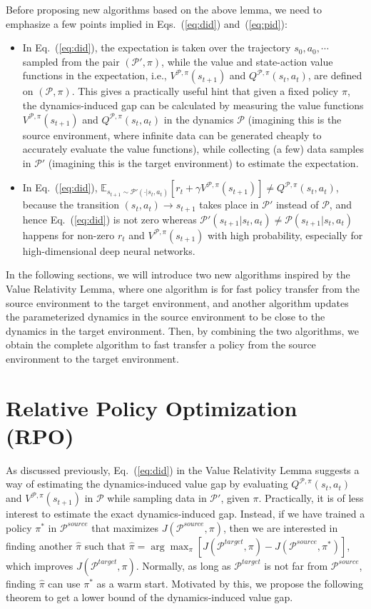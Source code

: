 \documentclass[letterpaper]{article} %
\def\E{{\mathbb{E}}}
\def\P{{\mathcal{P}}}
\begin{document}
Before proposing new algorithms based on the above lemma, we need to emphasize a few points implied in Eqs.~(\ref{eq:did}) and~(\ref{eq:pid}):
\begin{itemize}
	\item In Eq.~(\ref{eq:did}), the expectation is taken over the trajectory $s_0, a_0, \cdots$ sampled from the pair $(\P',\pi)$, while the value and state-action value functions in the expectation, i.e., $V^{\P,\pi}(s_{t+1})$ and $Q^{\P,\pi}(s_t,a_t)$, are defined on $(\P,\pi)$. This gives a practically useful hint that given a fixed policy $\pi$, the dynamics-induced gap can be calculated by measuring the value functions $V^{\P,\pi}(s_{t+1})$ and $Q^{\P,\pi}(s_t,a_t)$ in the dynamics $\P$ (imagining this is the source environment, where infinite data can be generated cheaply to accurately evaluate the value functions), while collecting (a few) data samples in $\P'$ (imagining this is the target environment) to estimate the expectation.
	\item In Eq.~(\ref{eq:did}), $\E_{s_{t+1}\sim\P'(\cdot|s_t,a_t)}[r_t+\gamma V^{\P,\pi}(s_{t+1})]\neq Q^{\P,\pi}(s_t,a_t)$, because the transition $(s_t,a_t)\xrightarrow{}s_{t+1}$ takes place in $\P'$ instead of $\P$, and hence Eq.~(\ref{eq:did}) is not zero whereas $\P'(s_{t+1}|s_t,a_t)\neq\P(s_{t+1}|s_t,a_t)$ happens for non-zero $r_t$ and $V^{\P,\pi}(s_{t+1})$ with high probability, especially for high-dimensional deep neural networks.

\end{itemize}
In the following sections, we will introduce two new algorithms inspired by the Value Relativity Lemma, where one algorithm is for fast policy transfer from the source environment to the target environment, and another algorithm updates the parameterized dynamics in the source environment to be close to the dynamics in the target environment. Then, by combining the two algorithms, we obtain the complete algorithm to fast transfer a policy from the source environment to the target environment.

\section{Relative Policy Optimization (RPO)}
\label{sec:rpo}
As discussed previously, Eq.~(\ref{eq:did}) in the Value Relativity Lemma suggests a way of estimating the dynamics-induced value gap by evaluating $Q^{\P,\pi}(s_t,a_t)$ and $V^{\P,\pi}(s_{t+1})$ in $\P$ while sampling data in $\P'$, given $\pi$. Practically, it is of less interest to estimate the exact dynamics-induced gap. Instead, if we have trained a policy $\pi^*$ in $\P^{source}$ that maximizes $J(\P^{source},\pi)$, then we are interested in finding another $\hat{\pi}$ such that $\hat{\pi}=\arg\max_{\pi} [J(\P^{target},\pi)-J(\P^{source},\pi^*)]$,
which improves $J(\P^{target},\pi)$. Normally, as long as $\P^{target}$ is not far from $\P^{source}$, finding $\hat{\pi}$ can use $\pi^*$ as a warm start. Motivated by this, we propose the following theorem to get a lower bound of the dynamics-induced value gap.
\end{document}

